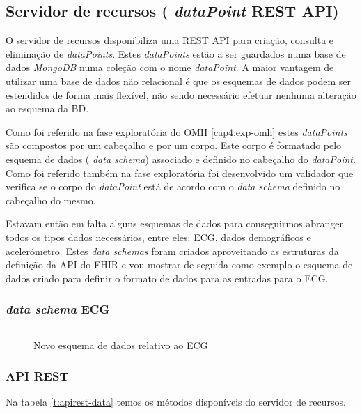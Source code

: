 \subsection{Servidor de recursos ( \textit{dataPoint} REST API) }
O servidor de recursos disponibiliza uma \gls{REST} \gls{API} para criação, consulta e eliminação de  \textit{dataPoints}. Estes  \textit{dataPoints} estão a ser guardados numa base de dados  \textit{MongoDB} numa coleção com o nome  \textit{dataPoint}. A maior vantagem de utilizar uma base de dados não relacional é que os esquemas de dados podem ser estendidos de forma mais flexível, não sendo necessário efetuar nenhuma alteração ao esquema da BD. 
\par 
Como foi referido na fase exploratória do \gls{OMH} \ref{cap4:exp-omh} estes  \textit{dataPoints} são compostos por um cabeçalho e por um corpo. Este corpo é formatado pelo esquema de dados ( \textit{data schema}) associado e definido no cabeçalho do  \textit{dataPoint}. Como foi referido também na fase exploratória foi desenvolvido um validador que verifica se o corpo do  \textit{dataPoint} está de acordo com o  \textit{data schema} definido no cabeçalho do mesmo. \par
Estavam então em falta alguns esquemas de dados para conseguirmos abranger todos os tipos dados necessários, entre eles: \gls{ECG}, dados demográficos e acelerómetro. Estes  \textit{data schemas} foram criados aproveitando as estruturas da definição da \gls{API} do \gls{FHIR} e vou mostrar de seguida como exemplo o esquema de dados criado para definir o formato de dados para as entradas para o \gls{ECG}. \newpage
\subsubsection{ \textit{data schema} ECG}
\begin{figure}[H]
\inputminted[fontsize=\scriptsize]{json}{code/ecg.json}
\caption[Novo esquema de dados relativo ao ECG]{Novo esquema de dados relativo ao ECG}
\label{f:ecgjsonschema}
\end{figure}

\subsubsection{API REST}
Na tabela \ref{t:apirest-data} temos os métodos disponíveis do servidor de recursos.
\label{l:restapiRESOURCES}

